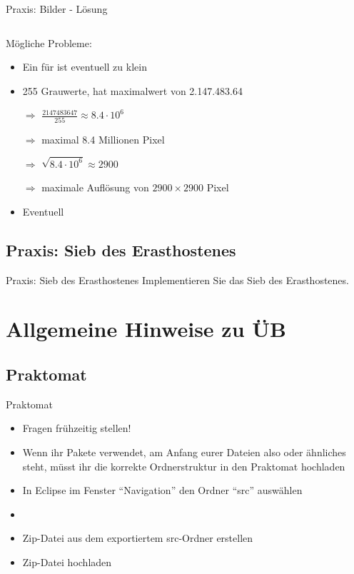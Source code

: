 \documentclass[usepdftitle=false,hyperref={pdfpagelabels=false}]{beamer}
\begin{document}
\begin{frame}{Praxis: Bilder - Lösung}
    \inputminted[linenos=true, numbersep=5pt, tabsize=4, fontsize=\tiny]{java}{Bilder.java}

    Mögliche Probleme:
    \begin{itemize}
        \item Ein  für  ist eventuell zu klein
        \item 255 Grauwerte,  hat maximalwert von 2.147.483.64
        \item[$\Rightarrow$] $\frac{2147483647}{255} \approx 8.4 \cdot 10^6$
        \item[$\Rightarrow$] maximal 8.4 Millionen Pixel
        \item[$\Rightarrow$] $\sqrt{8.4 \cdot 10^6} \approx 2900$
        \item[$\Rightarrow$] maximale Auflösung von $2900 \times 2900$ Pixel
        \item Eventuell 
    \end{itemize}
\end{frame}

\subsection{Praxis: Sieb des Erasthostenes}
\begin{frame}{Praxis: Sieb des Erasthostenes}
    Implementieren Sie das Sieb des Erasthostenes.
\end{frame}

\section{Allgemeine Hinweise zu ÜB}
\subsection{Praktomat}
\begin{frame}{Praktomat}
    \begin{itemize}
        \item Fragen frühzeitig stellen!
        \item Wenn ihr Pakete verwendet, am Anfang eurer Dateien 
              also  oder ähnliches steht,
              müsst ihr die korrekte Ordnerstruktur in den Praktomat 
              hochladen
        \item In Eclipse im Fenster "`Navigation"' den Ordner "`src"'
              auswählen
        \item {}
        \item Zip-Datei aus dem exportiertem src-Ordner erstellen
        \item Zip-Datei hochladen
    \end{itemize}
\end{frame}
\end{document}

